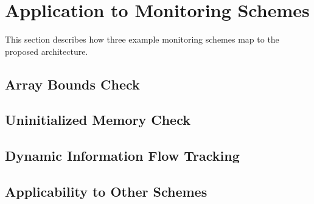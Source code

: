 \section{Application to Monitoring Schemes}
\label{sec:extensions}

This section describes how three example monitoring schemes map to the proposed
architecture.

\subsection{Array Bounds Check}

\subsection{Uninitialized Memory Check}

\subsection{Dynamic Information Flow Tracking}

\subsection{Applicability to Other Schemes}
